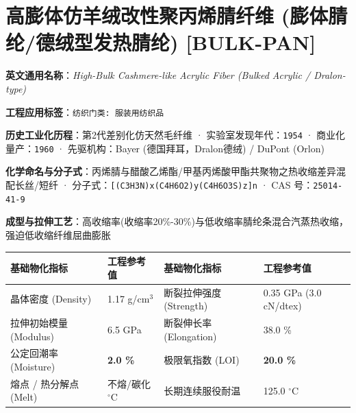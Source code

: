 \documentclass[11pt,openright,twoside,UTF8]{ctexbook}
\begin{document}
\section{高膨体仿羊绒改性聚丙烯腈纤维 (膨体腈纶/德绒型发热腈纶) [BULK-PAN]}
\label{sec:bulk-pan}

\noindent\textbf{英文通用名称}：\textit{High-Bulk Cashmere-like Acrylic Fiber (Bulked Acrylic / Dralon-type)}\par
\noindent\textbf{工程应用标签}：\texttt{纺织门类: 服装用纺织品}\par
\noindent\textbf{历史工业化历程}：第2代差别化仿天然毛纤维 · 实验室发现年代：\texttt{1954} · 商业化量产：\texttt{1960} · 先驱机构：Bayer (德国拜耳，Dralon德绒) / DuPont (Orlon)\par
\noindent\textbf{化学命名与分子式}：丙烯腈与醋酸乙烯酯/甲基丙烯酸甲酯共聚物之热收缩差异混配长丝/短纤 · 分子式：\texttt{[(C3H3N)x(C4H6O2)y(C4H6O3S)z]n} · CAS 号：\texttt{25014-41-9}\par
\noindent\textbf{成型与拉伸工艺}：高收缩率(收缩率20\%-30\%)与低收缩率腈纶条混合汽蒸热收缩，强迫低收缩纤维屈曲膨胀\par

\vspace{0.15cm}
\begin{center}
\small
\begin{tabularx}{\textwidth}{p{3.8cm}Xp{3.8cm}X}
\toprule
\textbf{基础物化指标} & \textbf{工程参考值} & \textbf{基础物化指标} & \textbf{工程参考值} \\
\midrule
晶体密度 (Density) & 1.17 g/cm$^3$ & 断裂拉伸强度 (Strength) & 0.35 GPa (3.0 cN/dtex) \\
拉伸初始模量 (Modulus) & 6.5 GPa & 断裂伸长率 (Elongation) & 38.0 \% \\
公定回潮率 (Moisture) & \textbf{2.0 \%} & 极限氧指数 (LOI) & \textbf{20.0 \%} \\
熔点 / 热分解点 (Melt) & 不熔/碳化 $^\circ\mathrm{C}$ & 长期连续服役耐温 & 125.0 $^\circ\mathrm{C}$ \\
\bottomrule
\end{tabularx}
\end{center}
\vspace{0.15cm}
\end{document}
